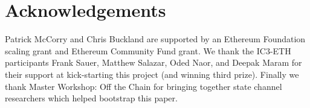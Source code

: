 \documentclass{llncs}
\begin{document}
	
	
	
	
	
	\section{Acknowledgements}
	
	Patrick McCorry and Chris Buckland are supported by an Ethereum Foundation scaling grant and Ethereum Community Fund grant.
	We thank the IC3-ETH participants Frank Sauer, Matthew Salazar, Oded Naor, and Deepak Maram for their support at kick-starting this project (and winning third prize). Finally we thank Master Workshop: Off the Chain for bringing together state channel researchers which helped bootstrap this paper. 
	
\end{document}
